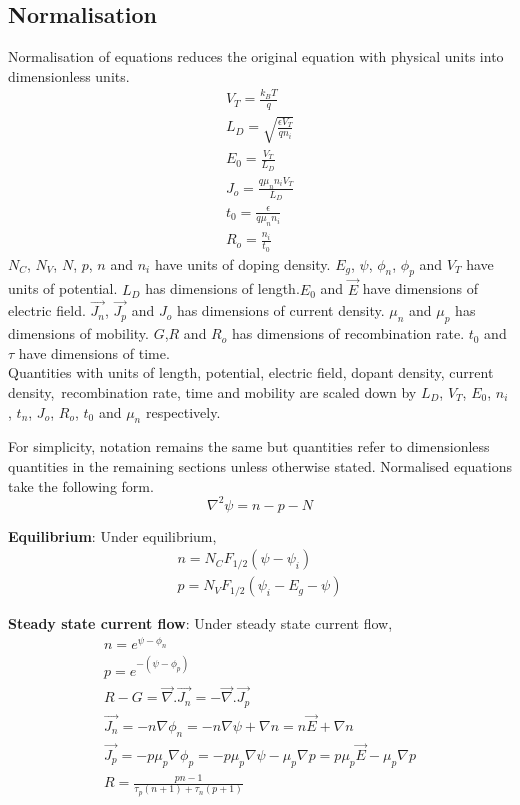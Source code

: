 \subsection{Normalisation}
Normalisation of equations reduces the original equation with physical units into dimensionless units.
\begin{align*}
V_T = \frac{k_BT}{q} \\ 
L_D = \sqrt{\frac{\epsilon V_T}{q n_i}} \\
E_0 = \frac{V_T}{L_D} \\
J_o = \frac{q \mu_n n_i V_T}{L_D} \\
t_0 = \frac{\epsilon}{q \mu_n n_i} \\
R_o = \frac{n_i}{t_0}
\tag{2.1} \label{eq:21} 
\end{align*}
$N_C$, $N_V$, $N$, $p$, $n$ and $n_i$ have units of doping density. $E_g$, $\psi$, $\phi_n$, $\phi_p$ and $V_T$  have units of potential. $L_D$ has dimensions of length.$E_0$ and $\vec{E}$ have dimensions of electric field.
$\vec{J_n}$, $\vec{J_p}$ and $J_o$ has dimensions of current density. $\mu_n$ and $\mu_p$ has dimensions of mobility. $G$,$R$ and $R_o$ has dimensions of recombination rate. $t_0$ and $\tau$ have dimensions of time.\\
Quantities with units of length, potential, electric field, dopant density, current density,\ recombination rate, time and mobility are scaled down by $L_D$, $V_T$, $E_0$, $n_i$, $t_n$, $J_o$, $R_o$, $t_0$ and $\mu_n$ respectively. 

For simplicity, notation remains the same but quantities refer to dimensionless quantities in the remaining sections unless otherwise stated. Normalised equations take the following form.
\begin{equation}
\nabla^2 \psi = n - p - N  \tag{2.2} \label{eq:22}
\end{equation}

\textbf{Equilibrium}:
Under equilibrium,
\begin{align*}
n =  N_C F_{1/2}(\psi-\psi_i) \\
p = N_V F_{1/2}(\psi_i-E_g-\psi)
\tag{2.3} \label{eq:23}
\end{align*}

\textbf{Steady state current flow}:
Under steady state current flow,
\begin{align*}
n = e^{\psi-\phi_n} \\
p = e^{-(\psi-\phi_p)} \\
R - G = \vec{\nabla}.\vec{J_n} = -\vec{\nabla}.\vec{J_p} \\
\vec{J_n} = -n\nabla\phi_n = -n\nabla\psi + \nabla n = n\vec{E} + \nabla n \\
\vec{J_p} = -p\mu_p\nabla\phi_p  = -p\mu_p\nabla\psi - \mu_p\nabla p = p\mu_p\vec{E} - \mu_p\nabla p \\
R = \frac{pn-1}{\tau_p(n+1) + \tau_n(p+1)}
\tag{2.4} \label{eq:24}
\end{align*}

